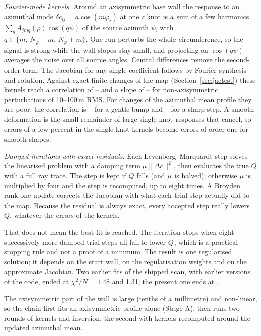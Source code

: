 \documentclass[11pt,a4paper]{article}
\newcommand{\um}{\,\textmu m}
\begin{document}
\emph{Fourier-mode kernels.} Around an axisymmetric base wall the response to an azimuthal mode
$\delta c_{ij}=a\cos(m\varphi_i)$ at one $z$ knot is a sum of a few harmonics
$\sum_q A_{jmq}(\rho)\cos(q\psi)$ of the source azimuth $\psi$, with $q\in\{m,\,N_\varphi-m,\,N_\varphi+m\}$.
One run perturbs the whole circumference, so the signal is strong while the wall slopes stay small, and
projecting on $\cos(q\psi)$ averages the noise over all source angles. Central differences remove the
second-order term. The Jacobian for any single coefficient follows by Fourier synthesis and rotation.
Against exact finite changes of the map (Section~\ref{sec:jactest}) these kernels reach a correlation
of \JacCorrMin--\JacCorrMax{} and a slope of \JacSlopeMin--\JacSlopeMax{} for non-axisymmetric
perturbations of 10--100\um{} RMS. For changes of the azimuthal mean profile they are poor: the
correlation is \JacBumpCorrMin--\JacBumpCorrMax{} for a gentle bump and
\JacStepCorrMin--\JacStepCorrMax{} for a sharp step. A smooth deformation is the small remainder of
large single-knot responses that cancel, so errors of a few percent in the single-knot kernels become
errors of order one for smooth shapes.

\emph{Damped iterations with exact residuals.} Each Levenberg--Marquardt step solves the linearised
problem with a damping term $\mu\lVert\Delta c\rVert^2$, then evaluates the true $Q$ with a full
ray trace. The step is kept if $Q$ falls (and $\mu$ is halved); otherwise $\mu$ is multiplied by
four and the step is recomputed, up to eight times. A Broyden rank-one update corrects the Jacobian
with what each trial step actually did to the map. Because the residual is always exact, every
accepted step really lowers $Q$, whatever the errors of the kernels.

That does not mean the best fit is reached. The iteration stops when eight successively more damped
trial steps all fail to lower $Q$, which is a practical stopping rule and not a proof of a minimum.
The result is one regularised solution; it depends on the start wall, on the regularisation weights
and on the approximate Jacobian. Two earlier fits of the shipped scan, with earlier versions of the
code, ended at $\chi^2/N=1.48$ and 1.31; the present one ends at \ChiTwo.

The axisymmetric part of the wall is large (tenths of a millimetre) and non-linear, so the chain
first fits an axisymmetric profile alone (Stage A), then runs two rounds of kernels and inversion,
the second with kernels recomputed around the updated azimuthal mean.
\end{document}

